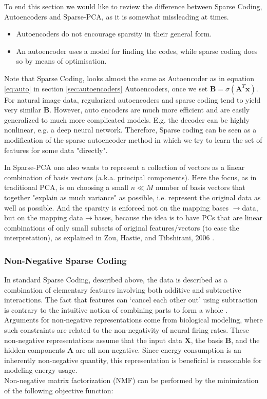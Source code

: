 To end this section we would like to review the difference between Sparse Coding, Autoencoders and Sparse-PCA, as it is somewhat missleading at times.

\begin{itemize}
	\item{Autoencoders do not encourage sparsity in their general form.}
	\item{An autoencoder uses a model for finding the codes, while sparse coding does so by means of optimisation.}
\end{itemize}

Note that Sparse Coding, looks almost the same as Autoencoder as in equation \ref{eq:auto} in section \ref{sec:autoencoders} Autoencoders, once we set $\mathbf{B}=\sigma (\mathbf{A}^T\mathbf{x})$. For natural image data, regularized autoencoders and sparse coding tend to yield very similar $\mathbf{B}$. However, auto encoders are much more efficient and are easily generalized to much more complicated models. E.g. the decoder can be highly nonlinear, e.g. a deep neural network. Therefore, Sparse coding can be seen as a modification of the sparse autoencoder method in which we try to learn the set of features for some data "directly".

In Sparse-PCA one also wants to represent a collection of vectors as a linear combination of basis vectors (a.k.a. principal components). Here the focus, as in traditional PCA, is on choosing a small $n \ll M$ number of basis vectors that together "explain as much variance" as possible, i.e. represent the original data as well as possible. And the sparsity is enforced not on the mapping bases $\rightarrow$data, but on the mapping data$\rightarrow$bases, because the idea is to have PCs that are linear combinations of only small subsets of original features/vectors (to ease the interpretation), as explained in Zou, Hastie, and Tibshirani, 2006 \cite{zou}.

\subsubsection{Non-Negative Sparse Coding}

\label{sec:nnsc}
In standard Sparse Coding, described above, the data is described as a combination of elementary features involving both additive and subtractive interactions. The fact that features can ‘cancel each other out’ using subtraction is contrary to the intuitive notion of combining parts to form a whole \cite{hoyer}. Arguments for non-negative representations come from biological modeling, where such constraints are related to the non-negativity of neural firing rates. These non-negative representations assume that the input data $\mathbf{X}$, the basis $\mathbf{B}$, and the hidden components $\mathbf{A}$ are all non-negative. Since energy consumption is an inherently non-negative quantity, this representation is beneficial is reasonable for modeling energy usage. \\
Non-negative matrix factorization (NMF) can be performed by the minimization of the following objective function:

